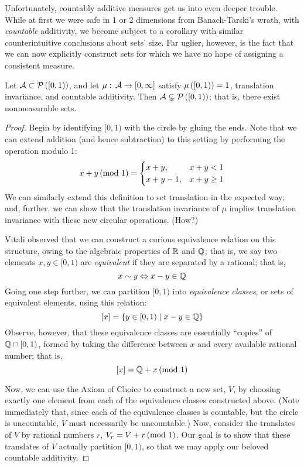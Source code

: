 Unfortunately, countably additive measures get us into even deeper trouble. While at first we were safe in 1 or 2 dimensions from Banach-Tarski's wrath, with \emph{countable} additivity, we become subject to a corollary with similar counterintuitive conclusions about sets' size. Far uglier, however, is the fact that we can now explicitly construct sets for which we have no hope of assigning a consistent measure.

\begin{theorem}
Let $\mathcal{A} \subset \mathcal{P}\left( [0,1) \right)$, and let $\mu: \, \mathcal{A} \to [0,\infty]$ satisfy $\mu\left( [0,1) \right) = 1$, translation invariance, and countable additivity. Then $\mathcal{A} \subsetneq \mathcal{P}\left( [0,1) \right)$; that is, there exist nonmeasurable sets.
\end{theorem}
\begin{proof}
Begin by identifying $[0,1)$ with the circle by gluing the ends. Note that we can extend addition (and hence subtraction) to this setting by performing the operation modulo 1:
\[
    x + y \,(\textrm{mod } 1) = 
\begin{cases}
    x + y,      & x + y < 1 \\
    x + y - 1,  & x + y \geq 1
\end{cases}
\]
We can similarly extend this definition to set translation in the expected way; and, further, we can show that the translation invariance of $\mu$ implies translation invariance with these new circular operations. (How?)

Vitali observed that we can construct a curious equivalence relation on this structure, owing to the algebraic properties of $\mathbb{R}$ and $\mathbb{Q}$; that is, we say two elements $x,y \in [0,1)$ are \emph{equivalent} if they are separated by a rational; that is,
\[ x \sim y \Leftrightarrow x - y \in \mathbb{Q} \]
Going one step further, we can partition $[0,1)$ into \emph{equivalence classes}, or sets of equivalent elements, using this relation:
\[ [x] = \left\{ y \in [0,1) \mid x - y \in \mathbb{Q} \right\} \]
Observe, however, that these equivalence classes are essentially ``copies'' of $\mathbb{Q} \cap [0,1)$, formed by taking the difference between $x$ and every available rational number; that is,
\[ [x] = \mathbb{Q} + x \,(\textrm{mod } 1) \]

Now, we can use the Axiom of Choice to construct a new set, $V$, by choosing exactly one element from each of the equivalence classes constructed above. (Note immediately that, since each of the equivalence classes is countable, but the circle is uncountable, $V$ must necessarily be uncountable.) Now, consider the translates of $V$ by rational numbers $r$, $V_r = V + r \,(\textrm{mod } 1)$. Our goal is to show that these translates of $V$ actually partition $[0, 1)$, so that we may apply our beloved countable additivity.


\end{proof}

